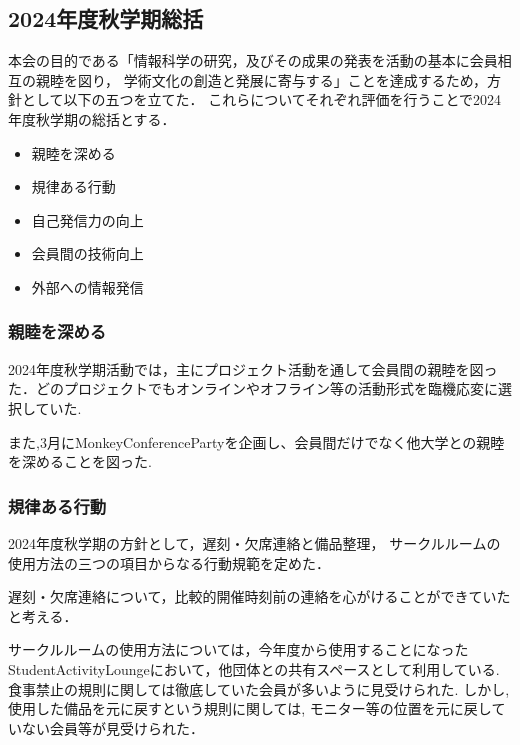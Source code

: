 \subsection*{2024年度秋学期総括}


本会の目的である「情報科学の研究，及びその成果の発表を活動の基本に会員相互の親睦を図り，
学術文化の創造と発展に寄与する」ことを達成するため，方針として以下の五つを立てた．
これらについてそれぞれ評価を行うことで2024年度秋学期の総括とする．

\begin{itemize}
    \item 親睦を深める
    \item 規律ある行動
    \item 自己発信力の向上
    \item 会員間の技術向上
    \item 外部への情報発信
\end{itemize}

\subsubsection*{親睦を深める}
    2024年度秋学期活動では，主にプロジェクト活動を通して会員間の親睦を図った．どのプロジェクトでもオンラインやオフライン等の活動形式を臨機応変に選択していた.

    また,3月にMonkeyConferencePartyを企画し、会員間だけでなく他大学との親睦を深めることを図った.

\subsubsection*{規律ある行動}
    2024年度秋学期の方針として，遅刻・欠席連絡と備品整理，
    サークルルームの使用方法の三つの項目からなる行動規範を定めた．

    遅刻・欠席連絡について，比較的開催時刻前の連絡を心がけることができていたと考える．

    サークルルームの使用方法については，今年度から使用することになったStudentActivityLoungeにおいて，他団体との共有スペースとして利用している.
    食事禁止の規則に関しては徹底していた会員が多いように見受けられた.
    しかし, 使用した備品を元に戻すという規則に関しては,  モニター等の位置を元に戻していない会員等が見受けられた．

